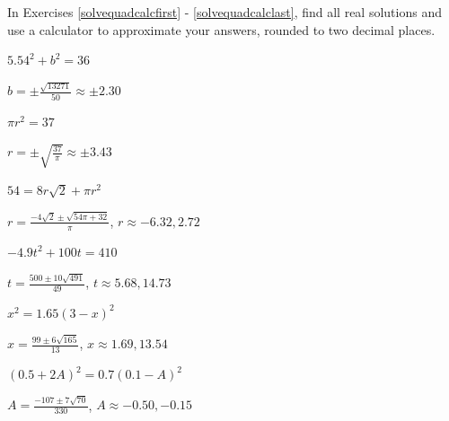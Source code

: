 \documentclass{ximera}
\begin{document}
\begin{question}

In Exercises \ref{solvequadcalcfirst} - \ref{solvequadcalclast}, find all real solutions and use a calculator to approximate your answers, rounded to two decimal places.

\begin{problem} \label{solvequadcalcfirst}
$5.54^2 + b^2 = 36$

\begin{solution}
$b = \pm \frac{\sqrt{13271}}{50} \approx \pm 2.30$
\end{solution}
\end{problem}

\begin{problem}
$\pi r^2 = 37$ 

\begin{solution}
$r = \pm \sqrt{\frac{37}{\pi}} \approx \pm 3.43$ 
\end{solution}
\end{problem}

\begin{problem}
$54 = 8r\sqrt{2} + \pi r^2$

\begin{solution}
$r = \frac{-4\sqrt{2} \pm \sqrt{54\pi + 32}}{\pi}$, $r \approx -6.32, 2.72$
\end{solution}
\end{problem}

\begin{problem}
$-4.9t^2 + 100t = 410$

\begin{solution}
$t = \frac{500 \pm 10\sqrt{491}}{49}$, $t \approx 5.68, 14.73$
\end{solution}
\end{problem}

\begin{problem}
$x^2 = 1.65(3-x)^2$

\begin{solution}
 $x = \frac{99 \pm 6 \sqrt{165}}{13}$, $x \approx 1.69, 13.54$
\end{solution}
\end{problem}

\begin{problem} \label{solvequadcalclast}
$(0.5+2A)^2 = 0.7(0.1-A)^2$ 

\begin{solution}
$A = \frac{-107 \pm 7 \sqrt{70}}{330}$, $A \approx -0.50, -0.15$
\end{solution}
\end{problem}

\end{question}
\end{document}
